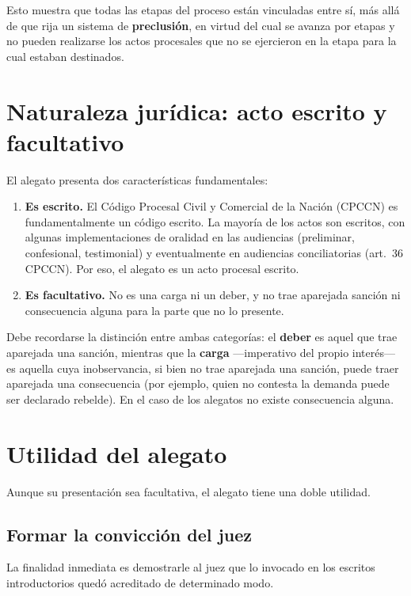\documentclass[12pt,oneside]{book}
\begin{document}
Esto muestra que todas las etapas del proceso están vinculadas entre sí, más allá de que rija un sistema de \textbf{preclusión}, en virtud del cual se avanza por etapas y no pueden realizarse los actos procesales que no se ejercieron en la etapa para la cual estaban destinados.

\section{Naturaleza jurídica: acto escrito y facultativo}

El alegato presenta dos características fundamentales:

\begin{enumerate}[label=\Alph*)]
    \item \textbf{Es escrito.} El Código Procesal Civil y Comercial de la Nación (CPCCN) es fundamentalmente un código escrito. La mayoría de los actos son escritos, con algunas implementaciones de oralidad en las audiencias (preliminar, confesional, testimonial) y eventualmente en audiencias conciliatorias (art.~36 CPCCN). Por eso, el alegato es un acto procesal escrito.
    \item \textbf{Es facultativo.} No es una carga ni un deber, y no trae aparejada sanción ni consecuencia alguna para la parte que no lo presente.
\end{enumerate}

Debe recordarse la distinción entre ambas categorías: el \textbf{deber} es aquel que trae aparejada una sanción, mientras que la \textbf{carga} ---imperativo del propio interés--- es aquella cuya inobservancia, si bien no trae aparejada una sanción, puede traer aparejada una consecuencia (por ejemplo, quien no contesta la demanda puede ser declarado rebelde). En el caso de los alegatos no existe consecuencia alguna.

\section{Utilidad del alegato}

Aunque su presentación sea facultativa, el alegato tiene una doble utilidad.

\subsection{Formar la convicción del juez}

La finalidad inmediata es demostrarle al juez que lo invocado en los escritos introductorios quedó acreditado de determinado modo.
\end{document}
